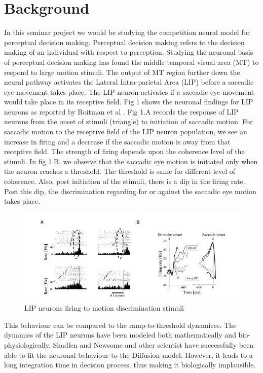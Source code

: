 \chapter*{Background}

In this seminar project we would be studying the competition neural model for perceptual decision making. Perceptual decision making refers to the decision making of an individual with respect to perception. Studying the neuronal basis of perceptual decision making has found the middle temporal visual area (MT) to respond to large motion stimuli. The output of MT region further down the neural pathway activates the Lateral Intra-parietal Area (LIP) before a saccadic eye movement takes place. The LIP neuron activates if a saccadic eye movement would take place in its receptive field. Fig 1 shows the neuronal findings for LIP neurons as reported by Roitman et al \cite{roitman2002response}. Fig 1.A records the response of LIP neurons from the onset of stimuli (triangle) to initiation of saccadic motion. For saccadic motion to the receptive field of the LIP neuron population, we see an increase in firing and a decrease if the saccadic motion is away from that receptive field. The strength of firing depends upon the coherence level of the stimuli. In fig 1.B. we observe that the saccadic eye motion is initiated only when the neuron reaches a threshold. The threshold is same for different level of coherence. Also, post initiation of the stimuli, there is a dip in the firing rate. Post this dip, the discrimination regarding for or against the saccadic eye motion takes place.

\begin{figure}
  \includegraphics[width=\linewidth]{fig/LIP.jpg}
  \caption{LIP neurons firing to motion discrimination stimuli}
  \label{fig:LIP neuron activity}
\end{figure}

This behaviour can be compared to the ramp-to-threshold dynamices. The dynamics of the LIP neurons have been modeled both mathematically and bio-physiologically. Shadlen and Newsome \cite{shadlen2001neural} and other scientist have successfully been able to fit the neuronal behaviour to the Diffusion model. However, it leads to a long integration time in decision process, thus making it biologically implausible. 

